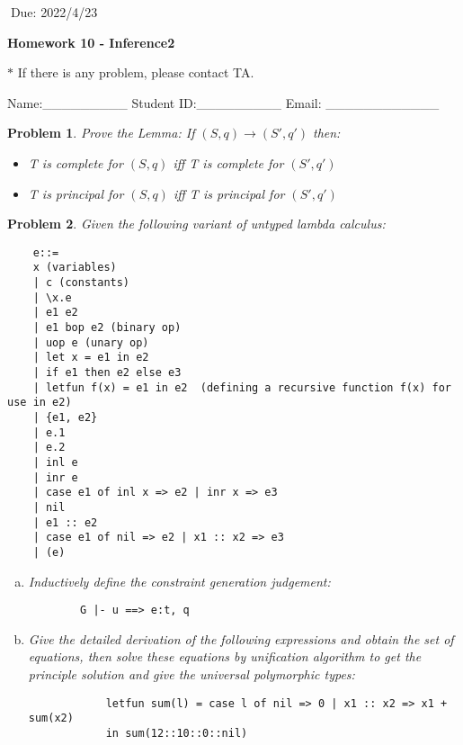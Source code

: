 \documentclass[12pt]{article}
\newtheorem{hw}{Problem}
\begin{document}
$\;$\hfill Due: 2022/4/23

\begin{center}
{\LARGE\bf Homework 10 - Inference2}
\end{center}

\begin{center}
	\footnotesize{\color{red}$*$ If there is any problem, please contact TA.}
	
	\footnotesize{\color{blue} \quad Name:\_\_\_\_\_\_\_\_\_  \quad Student ID:\_\_\_\_\_\_\_\_\_ \quad Email: \_\_\_\_\_\_\_\_\_\_\_\_}
\end{center}


\begin{hw}\rm
	Prove the Lemma: If $(S,q) \rightarrow (S', q')$ then:
	\begin{itemize}
		\item T is complete for $(S, q)$ iff T is complete for $(S',q')$
		
		\item T is principal for $(S,q)$ iff T is principal for $(S',q')$
	\end{itemize}
\end{hw}

\begin{hw}\rm
	Given the following variant of untyped lambda calculus:
	\begin{verbatim}
	e::=
	x (variables)
	| c (constants)
	| \x.e
	| e1 e2
	| e1 bop e2 (binary op)
	| uop e (unary op)
	| let x = e1 in e2
	| if e1 then e2 else e3
	| letfun f(x) = e1 in e2  (defining a recursive function f(x) for use in e2)
	| {e1, e2}
	| e.1
	| e.2
	| inl e
	| inr e
	| case e1 of inl x => e2 | inr x => e3
	| nil
	| e1 :: e2
	| case e1 of nil => e2 | x1 :: x2 => e3
	| (e)
	\end{verbatim}
	
	\begin{enumerate}[(a)]
		\item Inductively define the constraint generation judgement:
		\begin{verbatim}
		G |- u ==> e:t, q
		\end{verbatim}
		
		\item Give the detailed derivation of the following expressions and obtain the set of equations, then solve these equations by unification algorithm to get the principle solution and give the universal polymorphic types:
			\begin{verbatim}
			letfun sum(l) = case l of nil => 0 | x1 :: x2 => x1 + sum(x2) 
			in sum(12::10::0::nil)
			\end{verbatim}
	\end{enumerate}
\end{hw}
\end{document}
